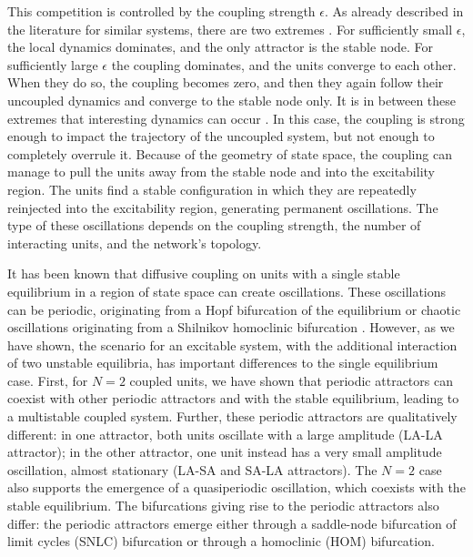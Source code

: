 This competition is controlled by the coupling strength $\epsilon$. As already described in the literature for similar systems, there are two extremes \cite{stankovski2017coupling}. For sufficiently small $\epsilon$, the local dynamics dominates, and the only attractor is the stable node. For sufficiently large $\epsilon$ the coupling dominates, and the units converge to each other. When they do so, the coupling becomes zero, and then they again follow their uncoupled dynamics and converge to the stable node only. It is in between these extremes that interesting dynamics can occur \cite{stankovski2017coupling}. In this case, the coupling is strong enough to impact the trajectory of the uncoupled system, but not enough to completely overrule it. Because of the geometry of state space, the coupling can manage to pull the units away from the stable node and into the excitability region. The units find a stable configuration in which they are repeatedly reinjected into the excitability region, generating permanent oscillations. The type of these oscillations depends on the coupling strength, the number of interacting units, and the network's topology.

It has been known that diffusive coupling on units with a single stable equilibrium in a region of state space can create oscillations. These oscillations can be periodic, originating from a Hopf bifurcation of the equilibrium \cite{smale1976a, pogromsky1999on} or chaotic oscillations \cite{kocarev1995on} originating from a Shilnikov homoclinic bifurcation \cite{nijholt2023chaotic}. However, as we have shown, the scenario for an excitable system, with the additional interaction of two unstable equilibria, has important differences to the single equilibrium case. First, for $N=2$ coupled units, we have shown that periodic attractors can coexist with other periodic attractors and with the stable equilibrium, leading to a multistable coupled system. Further, these periodic attractors are qualitatively different: in one attractor, both units oscillate with a large amplitude (LA-LA attractor); in the other attractor, one unit instead has a very small amplitude oscillation, almost stationary (LA-SA and SA-LA attractors). The $N=2$ case also supports the emergence of a quasiperiodic oscillation, which coexists with the stable equilibrium. The bifurcations giving rise to the periodic attractors also differ: the periodic attractors emerge either through a saddle-node bifurcation of limit cycles (SNLC) bifurcation or through a homoclinic (HOM) bifurcation.

